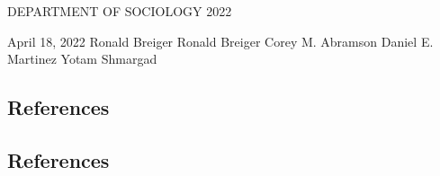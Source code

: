 \documentclass[dissertation]{uathesis}
\begin{document}
\maketitlepage
{DEPARTMENT OF SOCIOLOGY}	%
{2022}							

\approval
{April 18, 2022}		%
{Ronald Breiger}	%
{Ronald Breiger}	    %
{Corey M. Abramson}	    %
{Daniel E. Martinez}	%
{Yotam Shmargad}		%

\statementbyauthor




\tableofcontents

\listoffigures

\listoftables



\begin{refsection} %

\newpage
\section{References}
\begin{singlespace}
\printbibliography[heading=none] %
\end{singlespace}
\end{refsection}

\appendix

\begin{refsection} %

\newpage
\section{References}
\begin{singlespace}
\printbibliography[heading=none] %
\end{singlespace}
\end{refsection}
\end{document}
